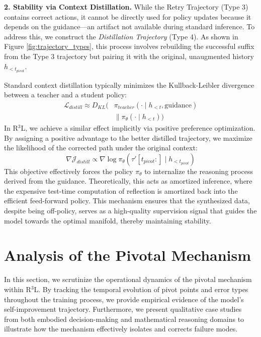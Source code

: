 \documentclass[11pt]{article}
\begin{document}
\textbf{2. Stability via Context Distillation.}
While the Retry Trajectory (Type 3) contains correct actions, it cannot be directly used for policy updates because it depends on the guidance—an artifact not available during standard inference. To address this, we construct the \textit{Distillation Trajectory} (Type 4). As shown in Figure \ref{fig:trajectory_types}, this process involves rebuilding the successful suffix from the Type 3 trajectory but pairing it with the original, unaugmented history $h_{<t_{pivot}}$.

Standard context distillation typically minimizes the Kullback-Leibler divergence between a teacher and a student policy:
\begin{equation}
\begin{split}
\mathcal{L}_{distill} \approx D_{KL}\Big( &\pi_{teacher}(\cdot \mid h_{<t}, \text{guidance}) \\
&\parallel \pi_{\theta}(\cdot \mid h_{<t}) \Big)
\end{split}
\end{equation}
In R$^3$L, we achieve a similar effect implicitly via positive preference optimization. By assigning a positive advantage to the better distilled trajectory, we maximize the likelihood of the corrected path under the original context:
\begin{equation}
\nabla \mathcal{J}_{distill} \propto \nabla \log \pi_{\theta}(\tau'[t_{pivot}:] \mid h_{<t_{pivot}})
\end{equation}
This objective effectively forces the policy $\pi_\theta$ to internalize the reasoning process derived from the guidance. Theoretically, this acts as amortized inference, where the expensive test-time computation of reflection is amortized back into the efficient feed-forward policy. This mechanism ensures that the synthesized data, despite being off-policy, serves as a high-quality supervision signal that guides the model towards the optimal manifold, thereby maintaining stability.

\section{Analysis of the Pivotal Mechanism}
\label{sec:pivot_analysis}
In this section, we scrutinize the operational dynamics of the pivotal mechanism within R$^3$L. By tracking the temporal evolution of pivot points and error types throughout the training process, we provide empirical evidence of the model's self-improvement trajectory. Furthermore, we present qualitative case studies from both embodied decision-making and mathematical reasoning domains to illustrate how the mechanism effectively isolates and corrects failure modes.
\end{document}
